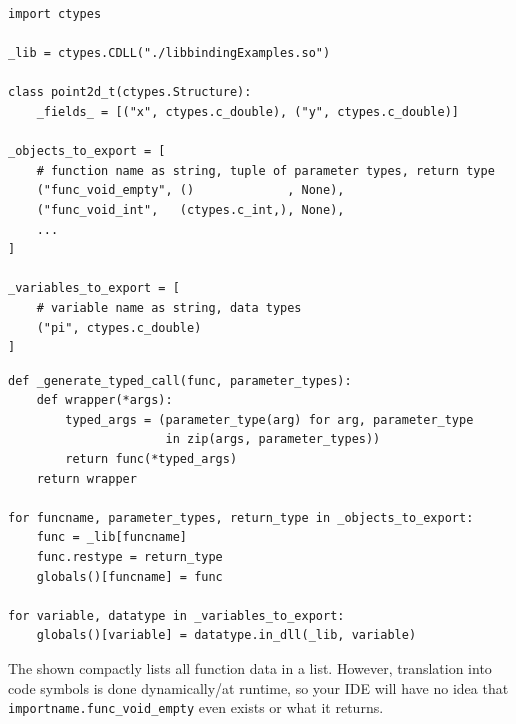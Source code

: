 
\begin{frame}[fragile]
%
\begin{codebox}
\begin{verbatim}
import ctypes

_lib = ctypes.CDLL("./libbindingExamples.so")

class point2d_t(ctypes.Structure):
    _fields_ = [("x", ctypes.c_double), ("y", ctypes.c_double)]

_objects_to_export = [
    # function name as string, tuple of parameter types, return type
    ("func_void_empty", ()             , None),
    ("func_void_int",   (ctypes.c_int,), None),
    ...
]

_variables_to_export = [
    # variable name as string, data types
    ("pi", ctypes.c_double)
]
\end{verbatim}
\end{codebox}
%
\end{frame}


\begin{frame}[fragile]
%
\begin{codebox}[... Continued]
\begin{verbatim}
def _generate_typed_call(func, parameter_types):
    def wrapper(*args):
        typed_args = (parameter_type(arg) for arg, parameter_type 
                      in zip(args, parameter_types))
        return func(*typed_args)
    return wrapper
    
for funcname, parameter_types, return_type in _objects_to_export:
    func = _lib[funcname]
    func.restype = return_type
    globals()[funcname] = func

for variable, datatype in _variables_to_export:
    globals()[variable] = datatype.in_dll(_lib, variable)
\end{verbatim}
\end{codebox}
%
\begin{warnbox}
\footnotesize
The shown compactly lists all function data in a list. However, translation into code symbols is done dynamically/at runtime, so your IDE will have no idea that \texttt{importname.func\_void\_empty} even exists or what it returns.
\end{warnbox}
%
\end{frame}

